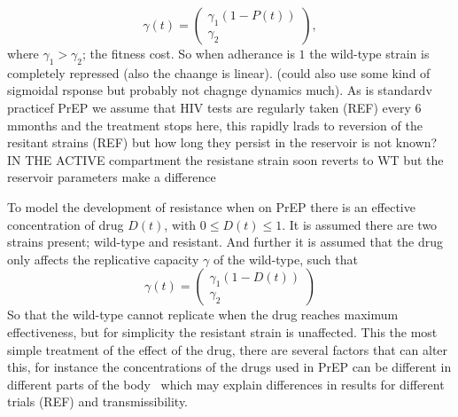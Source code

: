 \documentclass[DIV=15]{scrartcl}
\begin{document}
 \begin{equation}
\gamma (t) = \begin{pmatrix}
\gamma_1(1- P(t)) \\ \gamma_2
\end{pmatrix} , 
\label{gamma}
\end{equation}
where $\gamma_1>\gamma_2$; the fitness cost.
So when adherance is $1$ the wild-type strain is completely repressed (also the chaange is linear). (could also use some kind of sigmoidal rsponse but probably not chagnge dynamics much).  As is standardv  practicef PrEP we assume that HIV tests are regularly taken (REF) every 6 mmonths and the treatment stops here, this  rapidly  lrads to reversion of the resitant strains (REF) but how long they persist in the reservoir is not known?  IN THE ACTIVE compartment the resistane strain soon reverts to WT but the reservoir parameters make a difference 
\fi

 \iffalse
some stuff about  tenofovir resistane mutatns
\url{http://www.ncbi.nlm.nih.gov/pmc/articles/PMC3494163/}


rho is outflow -inflow no mutation low rtae in this model $ \rho = a-k/r_L$


mean generstion time in reservoir is1/a HIV

viral geneeration  is 1 day in active compartment 

\fi








To  model the development of resistance when on PrEP there is an effective concentration of drug $D(t)$, with $0 \leq D(t) \leq 1$. It is assumed there are two strains present; wild-type and resistant. And further it is assumed that the drug only affects the replicative  capacity $\gamma$ of the wild-type, such that \begin{equation*}
 \gamma(t) = \begin{pmatrix} \gamma_1(1- D(t)) \\ \gamma_2 \end{pmatrix}
\end{equation*}
So that the wild-type cannot  replicate when the drug reaches maximum effectiveness, but for simplicity the resistant strain is unaffected.
This the most simple treatment of the effect of the drug, there are several factors that can alter  this, for instance the concentrations of the drugs used in PrEP can be different in different parts of the body~\cite{patterson2011}
 which may explain differences in results for different trials (REF) and transmissibility.
\end{document}
